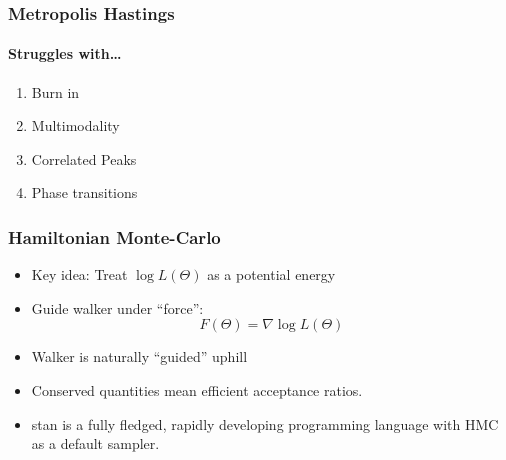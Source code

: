 \documentclass[%
]{beamer}
\begin{document}


\begin{frame}
  \frametitle{Metropolis Hastings} 
  \framesubtitle{Struggles with\ldots}
  \begin{enumerate}
      \pause\item Burn in
      \pause\item Multimodality
      \pause\item Correlated Peaks
      \pause\item Phase transitions
  \end{enumerate}
\end{frame}

\begin{frame}
  \frametitle{Hamiltonian Monte-Carlo} 
  \begin{itemize}
      \pause\item Key idea: Treat $\log L(\Theta)$ as a potential energy
      \pause\item Guide walker under ``force'': \[F(\Theta) =\nabla \log L(\Theta)\]
      \pause\item Walker is naturally ``guided'' uphill
      \pause\item Conserved quantities mean efficient acceptance ratios.
      \pause\item stan is a fully fledged, rapidly developing programming language with HMC as a default sampler.
  \end{itemize}
\end{frame}
\end{document}
